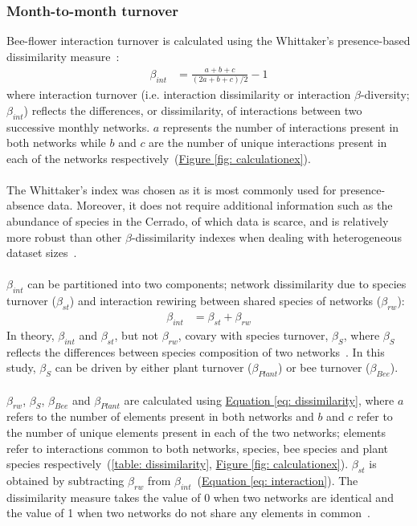 \documentclass[11pt]{article}
\begin{document}
\subsubsection{Month-to-month turnover}
Bee-flower interaction turnover is calculated using the Whittaker's presence-based dissimilarity measure~\citep{Whittaker1960}: 
\begin{align}
	\beta_{int} & = \frac{a + b + c}{(2a + b + c)/2} - 1 
\label{eq: dissimilarity}
\end{align}
where interaction turnover (i.e. interaction dissimilarity or interaction $\beta$-diversity; $\beta_{int}$) reflects the differences, or dissimilarity, of interactions between two successive monthly networks. $a$ represents the number of interactions present in both networks while $b$ and $c$ are the number of unique interactions present in each of the networks respectively~\citep{Poisot2012}(\hyperref[fig: calculationex]{Figure \ref{fig: calculationex}}). \\
\\
The Whittaker's index was chosen as it is most commonly used for presence-absence data. Moreover, it does not require additional information such as the abundance of species in the Cerrado, of which data is scarce, and is relatively more robust than other $\beta$-dissimilarity indexes when dealing with heterogeneous dataset sizes~\citep{Koleff2003, Poisot2012}. \\
\\
$\beta_{int}$ can be partitioned into two components; network dissimilarity due to species turnover ($\beta_{st}$) and interaction rewiring between shared species of networks ($\beta_{rw}$):
\begin{align}
	\beta_{int} & = \beta_{st} + \beta_{rw} 
\label{eq: interaction}
\end{align}
In theory, $\beta_{int}$ and $\beta_{st}$, but not $\beta_{rw}$, covary with species turnover, $\beta_{S}$, where $\beta_{S}$ reflects the differences between species composition of two networks~\citep{Poisot2012}. In this study, $\beta_{S}$ can be driven by either plant turnover ($\beta_{Plant}$) or bee turnover ($\beta_{Bee}$). \\
\\
$\beta_{rw}$, $\beta_{S}$, $\beta_{Bee}$ and $\beta_{Plant}$ are calculated using \hyperref[eq: dissimilarity]{Equation \ref{eq: dissimilarity}}, where $a$ refers to the number of elements present in both networks and $b$ and $c$ refer to the number of unique elements present in each of the two networks; elements refer to interactions common to both networks, species, bee species and plant species respectively~(\autoref{table: dissimilarity}, \hyperref[fig: calculationex]{Figure \ref{fig: calculationex}}). $\beta_{st}$ is obtained by subtracting $\beta_{rw}$ from $\beta_{int}$~(\hyperref[eq: interaction]{Equation \ref{eq: interaction}}). The dissimilarity measure takes the value of 0 when two networks are identical and the value of 1 when two networks do not share any elements in common~\citep{Poisot2012, CaraDonna2017}. \vspace{0.2cm}
\end{document}
